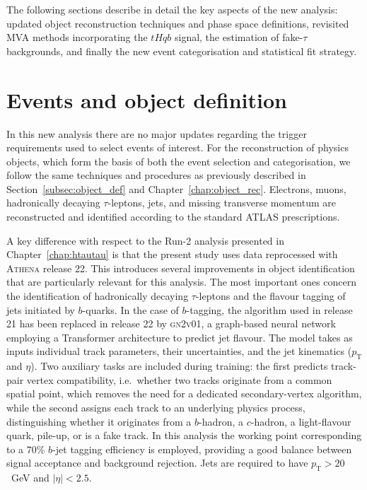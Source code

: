 The following sections describe in detail the key aspects of the new analysis: updated object reconstruction techniques and phase space definitions, revisited MVA methods incorporating the $tHqb$ signal, the estimation of fake-$\tau$ backgrounds, and finally the new event categorisation and statistical fit strategy.


\section{Events and object definition}

In this new analysis there are no major updates regarding the trigger requirements used to select events of interest. For the reconstruction of physics objects, which form the basis of both the event selection and categorisation, we follow the same techniques and procedures as previously described in Section~\ref{subsec:object_def} and Chapter~\ref{chap:object_rec}. Electrons, muons, hadronically decaying $\tau$-leptons, jets, and missing transverse momentum are reconstructed and identified according to the standard ATLAS prescriptions.

A key difference with respect to the Run-2 analysis presented in Chapter~\ref{chap:htautau} is that the present study uses data reprocessed with \textsc{Athena} release 22. This introduces several improvements in object identification that are particularly relevant for this analysis. The most important ones concern the identification of hadronically decaying $\tau$-leptons and the flavour tagging of jets initiated by $b$-quarks. In the case of $b$-tagging, the algorithm used in release 21 has been replaced in release 22 by \textsc{gn2v01}, a graph-based neural network employing a Transformer architecture to predict jet flavour. The model takes as inputs individual track parameters, their uncertainties, and the jet kinematics ($p_{\mathrm{T}}$ and $\eta$). Two auxiliary tasks are included during training: the first predicts track-pair vertex compatibility, i.e.\ whether two tracks originate from a common spatial point, which removes the need for a dedicated secondary-vertex algorithm, while the second assigns each track to an underlying physics process, distinguishing whether it originates from a $b$-hadron, a $c$-hadron, a light-flavour quark, pile-up, or is a fake track. In this analysis the working point corresponding to a 70\% $b$-jet tagging efficiency is employed, providing a good balance between signal acceptance and background rejection. Jets are required to have $p_{\mathrm{T}}>20$~GeV and $|\eta|<2.5$.

